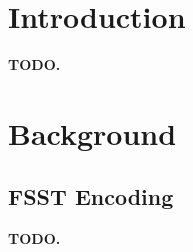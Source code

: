 \documentclass[sigconf,nonacm]{acmart}
\begin{document}
\maketitle


\section{Introduction}
\label{sec:intro}





\textbf{TODO.}


\section{Background}
\label{sec:background}


\subsection{FSST Encoding}
\label{sec:bg-fsst}

\textbf{TODO.}

\end{document}
